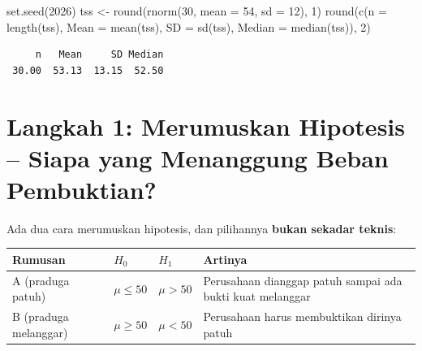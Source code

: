 \documentclass[
  indonesian,
  letterpaper,
]{book}
\newenvironment{Shaded}{\begin{snugshade}}{\end{snugshade}}
\newcommand{\AttributeTok}[1]{\textcolor[rgb]{0.40,0.45,0.13}{#1}}
\newcommand{\DecValTok}[1]{\textcolor[rgb]{0.68,0.00,0.00}{#1}}
\newcommand{\FunctionTok}[1]{\textcolor[rgb]{0.28,0.35,0.67}{#1}}
\newcommand{\NormalTok}[1]{\textcolor[rgb]{0.00,0.23,0.31}{#1}}
\newcommand{\OtherTok}[1]{\textcolor[rgb]{0.00,0.23,0.31}{#1}}
\newcounter{none} %
\begin{document}
\begin{Shaded}
\begin{Highlighting}[]
\FunctionTok{set.seed}\NormalTok{(}\DecValTok{2026}\NormalTok{)}
\NormalTok{tss }\OtherTok{\textless{}{-}} \FunctionTok{round}\NormalTok{(}\FunctionTok{rnorm}\NormalTok{(}\DecValTok{30}\NormalTok{, }\AttributeTok{mean =} \DecValTok{54}\NormalTok{, }\AttributeTok{sd =} \DecValTok{12}\NormalTok{), }\DecValTok{1}\NormalTok{)}
\FunctionTok{round}\NormalTok{(}\FunctionTok{c}\NormalTok{(}\AttributeTok{n =} \FunctionTok{length}\NormalTok{(tss), }\AttributeTok{Mean =} \FunctionTok{mean}\NormalTok{(tss), }\AttributeTok{SD =} \FunctionTok{sd}\NormalTok{(tss), }\AttributeTok{Median =} \FunctionTok{median}\NormalTok{(tss)), }\DecValTok{2}\NormalTok{)}
\end{Highlighting}
\end{Shaded}

\begin{verbatim}
     n   Mean     SD Median 
 30.00  53.13  13.15  52.50 
\end{verbatim}

\section{Langkah 1: Merumuskan Hipotesis -- Siapa yang Menanggung Beban
Pembuktian?}\label{langkah-1-merumuskan-hipotesis-siapa-yang-menanggung-beban-pembuktian}

Ada dua cara merumuskan hipotesis, dan pilihannya \textbf{bukan sekadar
teknis}:

{\def\LTcaptype{none} %
\begin{longtable}[]{@{}
  >{\raggedright\arraybackslash}p{}
  >{\raggedright\arraybackslash}p{}
  >{\raggedright\arraybackslash}p{}
  >{\raggedright\arraybackslash}p{}@{}}
\toprule\noalign{}
\begin{minipage}[b]{\linewidth}\raggedright
Rumusan
\end{minipage} & \begin{minipage}[b]{\linewidth}\raggedright
\(H_0\)
\end{minipage} & \begin{minipage}[b]{\linewidth}\raggedright
\(H_1\)
\end{minipage} & \begin{minipage}[b]{\linewidth}\raggedright
Artinya
\end{minipage} \\
\midrule\noalign{}
\endhead
\bottomrule\noalign{}
\endlastfoot
A (praduga patuh) & \(\mu \leq 50\) & \(\mu > 50\) & Perusahaan dianggap
patuh sampai ada bukti kuat melanggar \\
B (praduga melanggar) & \(\mu \geq 50\) & \(\mu < 50\) & Perusahaan
harus membuktikan dirinya patuh \\
\end{longtable}
}
\end{document}

